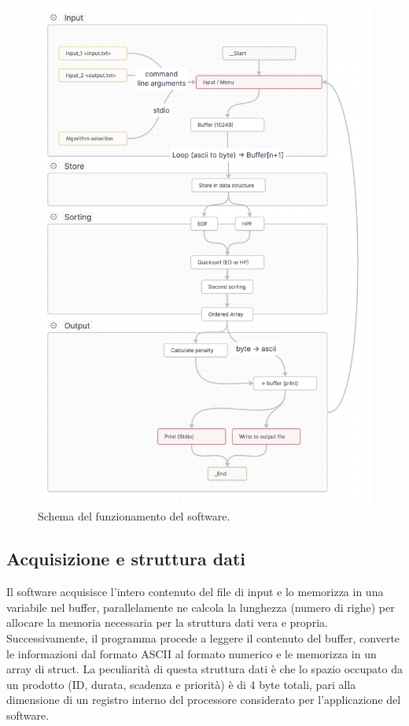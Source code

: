 \documentclass[a4paper]{report}
\begin{document}
\begin{figure}[H]
  \centering
  \includegraphics[width=\textwidth]{scheme.png}
  \caption{Schema del funzionamento del software.}
  \label{fig:schema}
\end{figure}

\subsection{Acquisizione e struttura dati}
Il software acquisisce l'intero contenuto del file di input e lo memorizza in una variabile nel buffer, parallelamente ne calcola la lunghezza (numero di righe) per allocare la memoria necessaria per la struttura dati vera e propria. Successivamente, il programma procede a leggere il contenuto del buffer, converte le informazioni dal formato ASCII al formato numerico e le memorizza in un array di struct. La peculiarità di questa struttura dati è che lo spazio occupato da un prodotto (ID, durata, scadenza e priorità) è di 4 byte totali, pari alla dimensione di un registro interno del processore considerato per l'applicazione del software.
\end{document}
